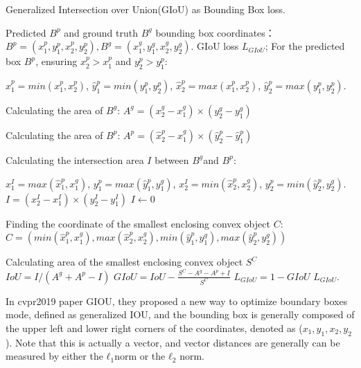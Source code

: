 \begin{algorithm}[htb]
  \caption{ Generalized Intersection over Union(GIoU) as Bounding Box loss.}
  \label{alg:Framwork}
  \begin{algorithmic}[1]
    \Require
    Predicted $B^{p}$ and ground truth $B^{g}$ bounding box coordinates：
     $ B^{p}=\left ( x_{1}^{p},y_{1}^{p},x_{2}^{p},y_{2}^{p} \right ),B^{g}=\left ( x_{1}^{g},y_{1}^{g},x_{2}^{g},y_{2}^{g} \right ).$
    \Ensure
     GIoU loss $L_{GIoU}$;
    \State For the predicted box $B^{p}$, ensuring $x_{2}^{p} > x_{1}^{p}$ and $y_{2}^{p} > y_{1}^{p}$:
    
    $\hat{x}_{1}^{p}=min( x_{1}^{p},x_{2}^{p})$, $\hat{y}_{1}^{p}=min( y_{1}^{p},y_{2}^{p})$,
    $\hat{x}_{2}^{p}=max( x_{1}^{p},x_{2}^{p})$, $\hat{y}_{2}^{p}=max( y_{1}^{p},y_{2}^{p})$.

    
    \State Calculating the area of $B^{g}$:
    $A^{g}=(x_{2}^{g}-x_{1}^{g}) \times (y_{2}^{g}-y_{1}^{g})$
   
    \State  Calculating the area of $B^{p}$:
    $A^{p}=(\hat{x}_{2}^{p}-\hat{x}_{1}^{g}) \times (\hat{y}_{2}^{p}-\hat{y}_{1}^{p})$
    
    \State Calculating the intersection area $I$ between  $B^{g}$and  $B^{p}$:
    
    $x_{1}^{I}=max( \hat{x}_{1}^{p},x_{1}^{g})$, $y_{1}^{p}=max( \hat{y}_{1}^{p},y_{1}^{g})$,
    $x_{2}^{I}=min(\hat{x}_{2}^{p},x_{2}^{g})$, $y_{2}^{p}=min(\hat{y}_{2}^{p},y_{2}^{g})$.
      \State  $I= (x_{2}^{I}-x_{1}^{I}) \times (y_{2}^{I}-y_{1}^{I})$ 
    \Else
      \State $I \gets 0$
      
    \EndIf
    \State Finding the coordinate of the smallest enclosing convex object $C$:
      $ C=\left ( min( \hat{x}_{1}^{p},x_{1}^{g}), max(\hat{x}_{2}^{p},x_{2}^{g}),
      min( \hat{y}_{1}^{p},y_{1}^{g}), max(\hat{y}_{2}^{p},y_{2}^{g}) \right )$
    
    \State Calculating area of the smallest enclosing convex object $S^{C}$
    \State $IoU=I/( A^{g} + A^{p} - I)$
    \State $GIoU=  IoU -\frac{S^{C}-A^{g} - A^{p} + I}{S^{C}}$
    \State $L_{GIoU}=1-GIoU$
    \newline
    \Return $L_{GIoU}$.
  \end{algorithmic}
\end{algorithm}

In cvpr2019 paper GIOU, they proposed a new way to optimize boundary boxes mode, defined as generalized IOU, and the bounding box is generally composed of the upper left and lower right corners of the coordinates, denoted as ($x_{1}, y_{1}, x_{2}, y_{2}$). Note that this is actually a vector, and vector distances are generally can be measured by either the $ ℓ_{1}$norm or the $ ℓ_{2}$ norm.

